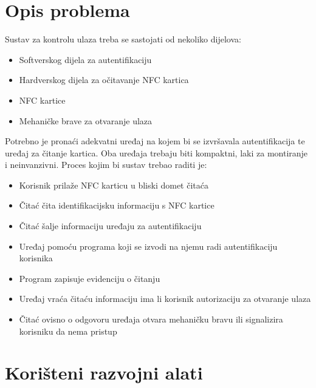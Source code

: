 \documentclass[times, utf8, zavrsni]{fer}
\begin{document}
\chapter{Opis problema}
Sustav za kontrolu ulaza treba se sastojati od nekoliko dijelova:
\begin{itemize}
\item Softverskog dijela za autentifikaciju
\item Hardverskog dijela za očitavanje NFC kartica
\item NFC kartice 
\item Mehaničke brave za otvaranje ulaza
\end{itemize}
Potrebno je pronaći adekvatni uređaj na kojem bi se izvršavala autentifikacija te uređaj za čitanje kartica. Oba uređaja trebaju biti kompaktni, laki za montiranje i neinvanzivni.
\newline
Proces kojim bi sustav trebao raditi je:
\begin{itemize}
\item Korisnik prilaže NFC karticu u bliski domet čitaća
\item Čitać čita identifikacijsku informaciju s NFC kartice
\item Čitać šalje informaciju uređaju za autentifikaciju
\item Uređaj pomoću programa koji se izvodi na njemu radi autentifikaciju korisnika
\item Program zapisuje evidenciju o čitanju
\item Uređaj vraća čitaću informaciju ima li korisnik autorizaciju za otvaranje ulaza
\item Čitać ovisno o odgovoru uređaja otvara mehaničku bravu ili signalizira korisniku da nema pristup
\end{itemize}

\chapter{Korišteni razvojni alati }
\end{document}
